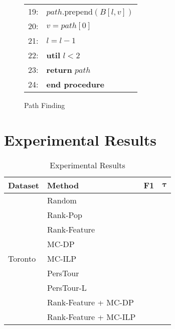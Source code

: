\documentclass{sig-alternate-05-2015}
\begin{document}
\begin{figure}
\begin{tabular}{p{3pt}l}
19:&\hspace{20pt}     $path$.prepend$(B[l, v])$ \\
20:&\hspace{20pt}     $v = path[0]$ \\
21:&\hspace{20pt}     $l = l - 1$ \\
22:&\hspace{10pt} \textbf{util} $l < 2$ \\
23:&\hspace{10pt} \textbf{return} $path$ \\
24:&\textbf{end procedure} \\
\end{tabular}
\caption{Path Finding}
\label{fig:path}
\end{figure}


\section{Experimental Results}
\begin{table}
\centering
\caption{Experimental Results}
\begin{tabular}{l|l|l|l} \hline
\textbf{Dataset} & \textbf{Method} & \textbf{F1} & $\mathbf{\tau}$ \\ 
\hline
\multirow{9}{*}{Toronto} & Random                & & \\
                         & Rank-Pop              & & \\
                         & Rank-Feature          & & \\
                         & MC-DP                 & & \\
                         & MC-ILP                & & \\
                         & PersTour              & & \\
                         & PersTour-L            & & \\
                         & Rank-Feature + MC-DP  & & \\
                         & Rank-Feature + MC-ILP & & \\
\hline
\end{tabular}
\end{table}
\end{document}

